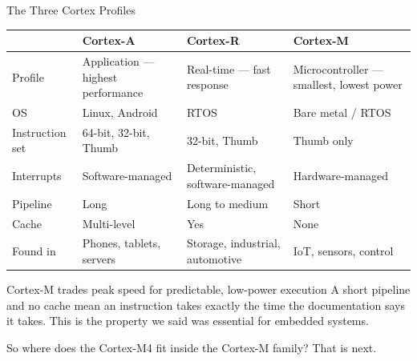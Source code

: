\documentclass[9pt,aspectratio=169,xcolor=table]{beamer}
\newcommand{\striped}{\rowcolors{1}{white}{stripe}}
\begin{document}
\begin{frame}{The Three Cortex Profiles}
	\begin{center}
		{\small
			\striped
			\begin{tabular}{@{}l R{.24\textwidth} R{.24\textwidth} R{.24\textwidth}@{}}
				\toprule
				& \textbf{Cortex-A} & \textbf{Cortex-R} & \textbf{Cortex-M} \\
				\midrule
				Profile & Application --- highest performance & Real-time --- fast response & Microcontroller --- smallest, lowest power \\
				OS & Linux, Android & RTOS & Bare metal / RTOS \\
		        Instruction set  & 64-bit, 32-bit, Thumb & 32-bit, Thumb & Thumb only \\
				Interrupts  & Software-managed & Deterministic, software-managed & Hardware-managed \\
				Pipeline & Long & Long to medium & {Short} \\
				Cache & Multi-level & Yes & {None} \\
				Found in & Phones, tablets, servers & Storage, industrial, automotive & IoT, sensors, control \\
				\bottomrule
		\end{tabular}}
	\end{center}
	\vspace{3mm}
	\begin{block}{Cortex-M trades peak speed for predictable, low-power execution}
    {\small A short pipeline and no cache mean an instruction takes exactly the time the documentation says it takes. This is the property we said was essential for embedded systems.}
	\end{block}
	\vspace{1mm}
	{\small\centering So where does the Cortex-M4 fit inside the Cortex-M family? That is next.\par}
\end{frame}
\end{document}
